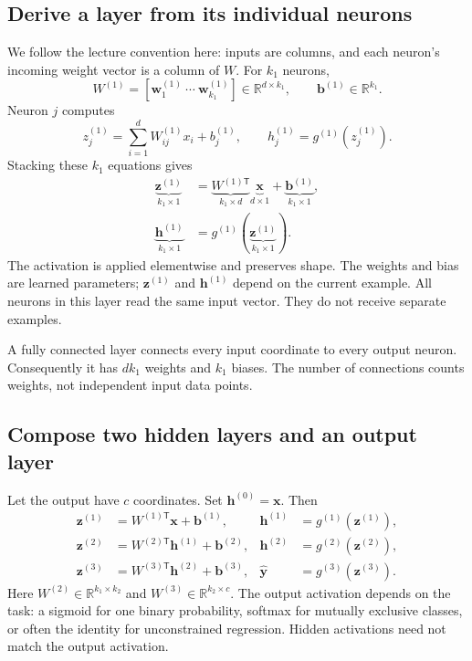 \subsection{Derive a layer from its individual neurons}
We follow the lecture convention here: inputs are columns, and each neuron's incoming weight vector is a column of $W$. For $k_1$ neurons,
\[
 W^{(1)}=[\mathbf{w}^{(1)}_1\ \cdots\ \mathbf{w}^{(1)}_{k_1}]
 \in\mathbb{R}^{d\times k_1},\qquad
 \mathbf{b}^{(1)}\in\mathbb{R}^{k_1}.
\]
Neuron $j$ computes
\[
 z^{(1)}_j=\sum_{i=1}^d W^{(1)}_{ij}x_i+b^{(1)}_j,
 \qquad h^{(1)}_j=g^{(1)}(z^{(1)}_j).
\]
Stacking these $k_1$ equations gives
\begin{align}
 \underbrace{\mathbf{z}^{(1)}}_{k_1\times1}
 &=\underbrace{W^{(1)\mathsf T}}_{k_1\times d}
   \underbrace{\mathbf{x}}_{d\times1}
   +\underbrace{\mathbf{b}^{(1)}}_{k_1\times1},\\
 \underbrace{\mathbf{h}^{(1)}}_{k_1\times1}
 &=g^{(1)}\!\left(\underbrace{\mathbf{z}^{(1)}}_{k_1\times1}\right).
\end{align}
The activation is applied elementwise and preserves shape. The weights and bias are learned parameters; $\mathbf{z}^{(1)}$ and $\mathbf{h}^{(1)}$ depend on the current example. All neurons in this layer read the same input vector. They do not receive separate examples.

A fully connected layer connects every input coordinate to every output neuron. Consequently it has $dk_1$ weights and $k_1$ biases. The number of connections counts weights, not independent input data points.

\subsection{Compose two hidden layers and an output layer}
Let the output have $c$ coordinates. Set $\mathbf{h}^{(0)}=\mathbf{x}$. Then
\begin{align}
 \mathbf{z}^{(1)}&=W^{(1)\mathsf T}\mathbf{x}+\mathbf{b}^{(1)},
 &\mathbf{h}^{(1)}&=g^{(1)}(\mathbf{z}^{(1)}),\\
 \mathbf{z}^{(2)}&=W^{(2)\mathsf T}\mathbf{h}^{(1)}+\mathbf{b}^{(2)},
 &\mathbf{h}^{(2)}&=g^{(2)}(\mathbf{z}^{(2)}),\\
 \mathbf{z}^{(3)}&=W^{(3)\mathsf T}\mathbf{h}^{(2)}+\mathbf{b}^{(3)},
 &\hat{\mathbf{y}}&=g^{(3)}(\mathbf{z}^{(3)}).
\end{align}
Here $W^{(2)}\in\mathbb{R}^{k_1\times k_2}$ and
$W^{(3)}\in\mathbb{R}^{k_2\times c}$. The output activation depends on the task: a sigmoid for one binary probability, softmax for mutually exclusive classes, or often the identity for unconstrained regression. Hidden activations need not match the output activation.

